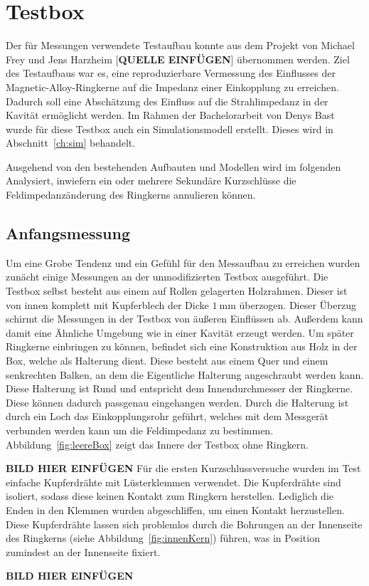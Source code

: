 \section{Testbox}
Der f\"ur Messungen verwendete Testaufbau konnte aus dem Projekt von Michael Frey und Jens Harzheim [\textbf{QUELLE EINF\"UGEN}] \"ubernommen werden. Ziel des Testaufbaus war es, eine reproduzierbare Vermessung des Einflusses der Magnetic-Alloy-Ringkerne auf die Impedanz einer Einkopplung zu erreichen. Dadurch soll eine Absch\"atzung des Einfluss auf die Strahlimpedanz in der Kavit\"at erm\"oglicht werden. Im Rahmen der Bachelorarbeit von Denys Bast wurde f\"ur diese Testbox auch ein Simulationsmodell erstellt. Dieses wird in Abschnitt~\ref{ch:sim} behandelt. 
\par
Ausgehend von den bestehenden Aufbauten und Modellen wird im folgenden Analysiert, inwiefern ein oder mehrere Sekund\"are Kurzschl\"usse die Feldimpedanz\"anderung des Ringkerns annulieren k\"onnen. 

\subsection{Anfangsmessung}
Um eine Grobe Tendenz und ein Gef\"uhl f\"ur den Messaufbau zu erreichen wurden zun\"acht einige Messungen an der unmodifizierten Testbox ausgef\"uhrt. Die Testbox selbst besteht aus einem auf Rollen gelagerten Holzrahmen. Dieser ist von innen komplett mit Kupferblech der Dicke $\SI{1}{\milli\meter}$ \"uberzogen. Dieser Überzug schirmt die Messungen in der Testbox von \"au\ss{}eren Einfl\"ussen ab. Au\ss{}erdem kann damit eine Ähnliche Umgebung wie in einer Kavit\"at erzeugt werden. Um sp\"ater Ringkerne einbringen zu k\"onnen, befindet sich eine Konstruktion aus Holz in der Box, welche als Halterung dient. Diese besteht aus einem Quer und einem senkrechten Balken, an dem die Eigentliche Halterung angeschraubt werden kann. Diese Halterung ist Rund und entspricht dem Innendurchmesser der Ringkerne. Diese k\"onnen dadurch passgenau eingehangen werden. Durch die Halterung ist durch ein Loch das Einkopplungsrohr gef\"uhrt, welches mit dem Messger\"at verbunden werden kann um die Feldimpedanz zu bestimmen. Abbildung~\ref{fig:leereBox} zeigt das Innere der Testbox ohne Ringkern.
\par
\textbf{BILD HIER EINFÜGEN}
F\"ur die ersten Kurzschlussversuche wurden im Test einfache Kupferdr\"ahte mit L\"usterklemmen verwendet. Die Kupferdr\"ahte sind isoliert, sodass diese keinen Kontakt zum Ringkern herstellen. Lediglich die Enden in den Klemmen wurden abgeschliffen, um einen Kontakt herzustellen. Diese Kupferdr\"ahte lassen sich problemlos durch die Bohrungen an der Innenseite des Ringkerns (siehe Abbildung~\ref{fig:innenKern}) f\"uhren, was in Position zumindest an der Innenseite fixiert.
\par
\textbf{BILD HIER EINFÜGEN}


